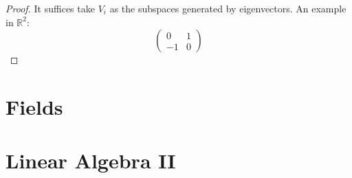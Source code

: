 \documentclass[openany]{book}
\newcommand{\R}{\mathbb{R}}
\begin{document}
\begin{proof}
    It suffices take $V_i$ as the subspaces generated by eigenvectors.
    An example in $\R^2$:
    \begin{equation*}
        \begin{pmatrix}
            0&1\\
            -1&0
        \end{pmatrix}
    \end{equation*}

\end{proof}
































\chapter{Fields}


\chapter{Linear Algebra II}
\end{document}

